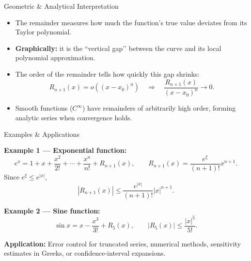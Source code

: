 \documentclass[aspectratio=169]{beamer}
\begin{document}
\begin{frame}{Geometric \& Analytical Interpretation}

\begin{itemize}
  \item The remainder measures how much the function’s true value
        deviates from its Taylor polynomial.
  \item \textbf{Graphically:} it is the “vertical gap’’ between the curve
        and its local polynomial approximation.
  \item The order of the remainder tells how quickly this gap shrinks:
        \[
        R_{n+1}(x) = o((x-x_0)^n)
        \quad\Rightarrow\quad
        \frac{R_{n+1}(x)}{(x-x_0)^n}\to 0.
        \]
  \item Smooth functions (\(C^\infty\)) have remainders of arbitrarily high order,
        forming analytic series when convergence holds.
\end{itemize}

\end{frame}


\begin{frame}{Examples \& Applications}

\textbf{Example 1 — Exponential function:}
\[
e^x = 1 + x + \frac{x^2}{2!} + \cdots + \frac{x^n}{n!}
      + R_{n+1}(x),
\qquad
R_{n+1}(x)=\frac{e^\xi}{(n+1)!}x^{n+1}.
\]
Since \(e^\xi \le e^{|x|}\),
\[
|R_{n+1}(x)| \le \frac{e^{|x|}}{(n+1)!}|x|^{n+1}.
\]

\textbf{Example 2 — Sine function:}
\[
\sin x = x - \frac{x^3}{3!} + R_5(x),
\qquad
|R_5(x)| \le \frac{|x|^5}{5!}.
\]

\textbf{Application:}
Error control for truncated series, numerical methods, sensitivity estimates in Greeks, or confidence-interval expansions.

\end{frame}

\end{document}
